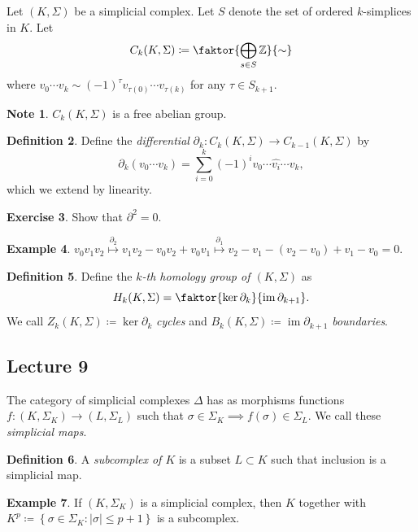 \documentclass[10pt,letterpaper,cm]{nupset}
\theoremstyle{definition}
\newtheorem{definition}{Definition}[subsection]
\newtheorem{exmp}[definition]{Example}
\newtheorem{note}[definition]{Note}
\theoremstyle{theorem}
\newtheorem{exercise}[definition]{Exercise}
\theoremstyle{remark}
\newcommand{\Z}{\mathbb Z}
\newcommand{\1}{\mathbb{1}}
\newcommand{\0}{\vec 0}
\DeclareMathOperator{\im}{im}
\begin{document}
Let $\left(K, \Sigma\right)$ be a simplicial complex. Let $S$ denote the set of ordered $k$-simplices in $K$. Let $$C_k(K, \Sigma) \coloneqq \faktor{\bigoplus_{s\in S} \Z}{\sim}$$ where  $v_0\cdots v_k \sim ({-1})^{\tau} v_{\tau(0)}\cdots v_{\tau(k)}$ for any $\tau \in S_{k+1}$.


\begin{note}
$C_k(K, \Sigma)$ is a free abelian group.
\end{note}

\begin{definition}
Define the \textit{differential} $\partial_{k} : C_k(K, \Sigma) \to C_{k-1}(K, \Sigma)$ by  $$\partial_{k}(v_0\cdots v_k) = \sum_{i=0}^k ({-1})^i v_0 \cdots \widehat{v_i} \cdots v_k, $$ which we extend by linearity.  
\end{definition}

\begin{exercise}
Show that $\partial^2 =0$.
\end{exercise}

\begin{exmp}
$v_0v_1v_2 \overset{\partial_2}{\longmapsto}  v_1 v_2 - v_0v_2 + v_0v_1  \overset{\partial_1}{\longmapsto} v_2 - v_1 -(v_2 - v_0) + v_1 - v_0 =0 .$
\end{exmp}

\begin{definition}
Define the \textit{$k$-th homology group of $(K , \Sigma)$} as $$H_k(K, \Sigma) = \faktor{\ker{\partial_k}}{\im{\partial_{k+1}}}.$$ We call $Z_k(K, \Sigma)\coloneqq  \ker{\partial_k}$ \textit{cycles} and $B_k(K, \Sigma)\coloneqq  \im{\partial_{k+1}}$ \textit{boundaries}.
\end{definition}

\subsection{Lecture 9}


The category of simplicial complexes $\Delta$ has as morphisms functions $f: \left(K, \Sigma_K\right) \to \left(L, \Sigma_L\right)$ such that $\sigma \in \Sigma_K \implies f(\sigma) \in \Sigma_L$. We call these \textit{simplicial maps}.


\begin{definition}
A \textit{subcomplex of $K$} is a subset $L \subset K$ such that inclusion is a simplicial map.
\end{definition}

\begin{exmp}
If $\left(K, \Sigma_K\right)$ is a simplicial complex, then $K$ together with $K^p \coloneqq   \left\{\sigma \in \Sigma_K : \left\lvert{\sigma}\right\rvert \leq p+1\right\}$ is a subcomplex.
\end{exmp}
\end{document}
